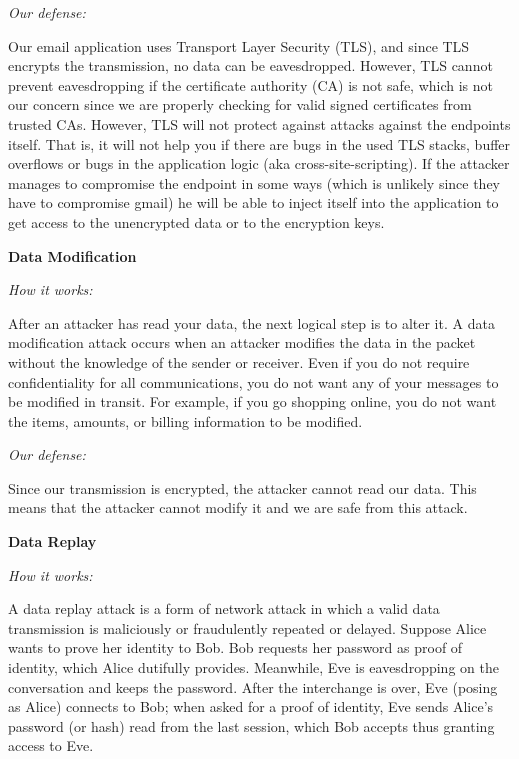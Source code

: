 \documentclass[a4paper,twoside,10pt]{report}
\begin{document}
\vspace{2.5mm}
\noindent
\textit{Our defense: }

Our email application uses Transport Layer Security (TLS), and since TLS encrypts the transmission, no data can be eavesdropped. However, TLS cannot prevent eavesdropping if the certificate authority (CA) is not safe, which is not our concern since we are properly checking for valid signed certificates from trusted CAs. However, TLS will not protect against attacks against the endpoints itself. That is, it will not help you if there are bugs in the used TLS stacks, buffer overflows or bugs in the application logic (aka cross-site-scripting). If the attacker manages to compromise the endpoint in some ways (which is unlikely since they have to compromise gmail) he will be able to inject itself into the application to get access to the unencrypted data or to the encryption keys.

\vspace{2.5mm}
\noindent
{\large\textbf{Data Modification}}

\vspace{1mm}
\noindent
\textit{How it works: }

After an attacker has read your data, the next logical step is to alter it. A data modification attack occurs when an attacker modifies the data in the packet without the knowledge of the sender or receiver. Even if you do not require confidentiality for all communications, you do not want any of your messages to be modified in transit. For example, if you go shopping online, you do not want the items, amounts, or billing information to be modified.

\vspace{2.5mm}
\noindent
\textit{Our defense: }

Since our transmission is encrypted, the attacker cannot read our data. This means that the attacker cannot modify it and we are safe from this attack.

\vspace{2.5mm}
\noindent
{\large\textbf{Data Replay}}

\vspace{1mm}
\noindent
\textit{How it works: }

A data replay attack is a form of network attack in which a valid data transmission is maliciously or fraudulently repeated or delayed. Suppose Alice wants to prove her identity to Bob. Bob requests her password as proof of identity, which Alice dutifully provides. Meanwhile, Eve is eavesdropping on the conversation and keeps the password. After the interchange is over, Eve (posing as Alice) connects to Bob; when asked for a proof of identity, Eve sends Alice's password (or hash) read from the last session, which Bob accepts thus granting access to Eve.
\end{document}
